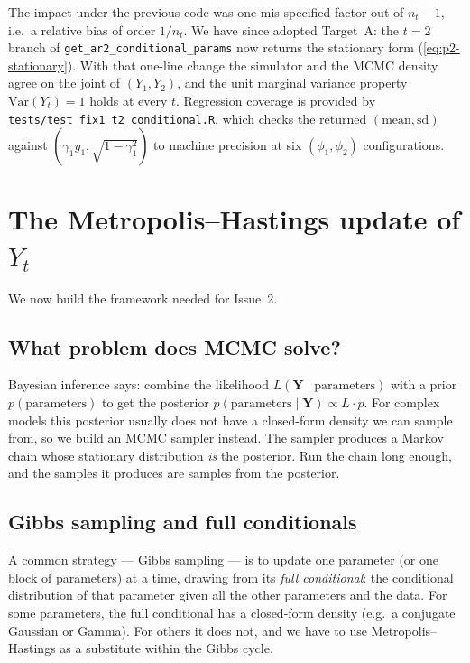 \documentclass[11pt]{article}
\newcommand{\bY}{\mathbf{Y}}
\newcommand{\eref}[1]{(\ref{#1})}
\theoremstyle{plain}
\theoremstyle{definition}
\theoremstyle{remark}
\begin{document}
The impact under the previous code was one mis-specified factor out of
$n_t - 1$, i.e.\ a relative bias of order $1/n_t$. We have since adopted
Target~A: the $t = 2$ branch of \texttt{get\_ar2\_conditional\_params}
now returns the stationary form \eref{eq:p2-stationary}. With that
one-line change the simulator and the MCMC density agree on the joint
of $(Y_1, Y_2)$, and the unit marginal variance property
$\mathrm{Var}(Y_t) = 1$ holds at every $t$. Regression coverage is
provided by \texttt{tests/test\_fix1\_t2\_conditional.R}, which checks
the returned $(\mathrm{mean}, \mathrm{sd})$ against
$(\gamma_1 y_1, \sqrt{1 - \gamma_1^2})$ to machine precision at six
$(\phi_1, \phi_2)$ configurations.

\section{The Metropolis--Hastings update of \texorpdfstring{$Y_t$}{Yt}}\label{sec:mh}

We now build the framework needed for Issue~2.

\subsection{What problem does MCMC solve?}\label{sec:problem}

Bayesian inference says: combine the likelihood $L(\bY \mid \text{parameters})$
with a prior $p(\text{parameters})$ to get the posterior
$p(\text{parameters} \mid \bY) \propto L \cdot p$. For complex models
this posterior usually does not have a closed-form density we can sample
from, so we build an MCMC sampler instead. The sampler produces a Markov
chain whose stationary distribution \emph{is} the posterior. Run the
chain long enough, and the samples it produces are samples from the
posterior.

\subsection{Gibbs sampling and full conditionals}\label{sec:gibbs}

A common strategy --- Gibbs sampling --- is to update one parameter (or one
block of parameters) at a time, drawing from its \emph{full conditional}:
the conditional distribution of that parameter given all the other
parameters and the data. For some parameters, the full conditional has
a closed-form density (e.g.\ a conjugate Gaussian or Gamma). For others
it does not, and we have to use Metropolis--Hastings as a substitute
within the Gibbs cycle.
\end{document}
